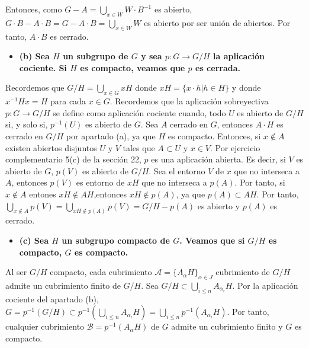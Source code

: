 \documentclass{article}
\begin{document}
Entonces, como $G-A=\bigcup_{x\in W}W\cdot B^{-1}$ es abierto, $G\cdot B-A\cdot B =G-A\cdot B= \bigcup_{x\in W}W$ es abierto por ser unión de abiertos. Por tanto, $A\cdot B$ es cerrado.
\begin{itemize}
\item \bf (b) \rm Sea $H$ un subgrupo de $G$ y sea $p:G\rightarrow G/H$ la aplicación cociente. Si $H$ es compacto, veamos que $p$ es cerrada.
\end{itemize}
Recordemos que $G/H=\bigcup_{x\in G}xH$ donde $xH=\{x\cdot h|h \in H\}$ y donde $x^{-1}Hx=H$ para cada $x\in G$. Recordemos que la aplicación sobreyectiva $p:G\rightarrow G/H$ se define como aplicación cociente cuando, todo $U$ es abierto de $G/H$ si, y solo si, $p^{-1}(U)$ es abierto de $G$. Sea $A$ cerrado en $G$, entonces $A\cdot H$ es cerrado en $G/H$ por apartado (a), ya que $H$ es compacto. Entonces, si $x\notin A$ existen abiertos disjuntos $U$ y $V$ tales que $A\subset U$ y $x\in V$. Por ejercicio complementario 5(c) de la sección 22, $p$ es una aplicación abierta. Es decir, si $V$ es abierto de $G$, $p(V)$ es abierto de $G/H$. Sea el entorno $V$ de $x$ que no interseca a $A$, entonces $p(V)$ es entorno de $xH$ que no interseca a $p(A)$. Por tanto, si $x\notin A$ entones $xH\notin AH$,entonces $xH\notin p(A)$, ya que $p(A)\subset AH$. Por tanto, $\bigcup_{x\notin A} p(V) =\bigcup_{xH\notin p(A)} p(V) =G/H-p(A)$ es abierto y $p(A)$ es cerrado.
\begin{itemize}
\item \bf (c) \rm Sea $H$ un subgrupo compacto de $G$. Veamos que si $G/H$ es compacto, $G$ es compacto.
\end{itemize}
Al ser $G/H$ compacto, cada cubrimiento $\mathcal{A}=\{A_\alpha H\}_{\alpha\in J}$  cubrimiento de $G/H$ admite un cubrimiento finito de $G/H$. Sea $G/H\subset \bigcup_{i\leq n}A_{\alpha_i} H$. Por la aplicación cociente del apartado (b), $G= p^{-1}(G/H)\subset p^{-1}\left(\bigcup_{i\leq n}A_{\alpha_i} H\right)=\bigcup_{i\leq n}p^{-1}(A_{\alpha_i} H)$. Por tanto, cualquier cubrimiento $\mathcal{B}=p^{-1}(A_{\alpha} H)$ de $G$ admite un cubrimiento finito y $G$ es compacto.
\end{document}
